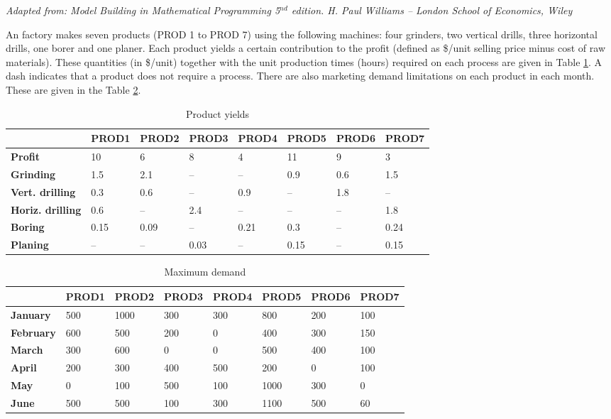 \textit{Adapted from: Model Building in Mathematical Programming 5$^{nd}$ edition.
	H. Paul Williams -- London School of Economics, Wiley}

An factory makes seven products (PROD 1 to PROD 7) using the
following machines: four grinders, two vertical drills, three horizontal drills, one
borer and one planer. Each product yields a certain contribution to the profit (defined
as \$/unit selling price minus cost of raw materials). These quantities (in \$/unit)
together with the unit production times (hours) required on each process are given
in Table \ref{table:prodyield}. A dash indicates that a product does not require a process. 
There are also marketing demand limitations on each product in each month. These are given in the Table \ref{table:mark}.

\begin{table}[h]
	\begin{tabular}{l|lllllll}
		& \textbf{PROD1} & \textbf{PROD2} & \textbf{PROD3} & \textbf{PROD4} & \textbf{PROD5} & \textbf{PROD6} & \textbf{PROD7} \\ \hline 
		\textbf{Profit} & 10    & 6     & 8     & 4     & 11    & 9     & 3     \\
		\textbf{Grinding}              & 1.5   & 2.1   & –     & –     & 0.9   & 0.6   & 1.5   \\
		\textbf{Vert. drilling}     & 0.3   & 0.6   & –     & 0.9   & –     & 1.8   & –     \\
		\textbf{Horiz. drilling}   & 0.6   & –     & 2.4   & –     & –     & –     & 1.8   \\
		\textbf{Boring}                & 0.15  & 0.09  & –     & 0.21  & 0.3   & –     & 0.24  \\
		\textbf{Planing}               & –     & –     & 0.03  & –     & 0.15  & –     & 0.15 \\ \hline
	\end{tabular}
	\caption{Product yields}
	\label{table:prodyield}
\end{table}

\begin{table}[H]
	\begin{tabular}{l|lllllll}
		& \textbf{PROD1} & \textbf{PROD2} & \textbf{PROD3} & \textbf{PROD4} & \textbf{PROD5} & \textbf{PROD6} & \textbf{PROD7} \\ \hline
		\textbf{January}   & 500   & 1000  & 300   & 300   & 800   & 200   & 100   \\
		\textbf{February}  & 600   & 500   & 200   & 0     & 400   & 300   & 150   \\
		\textbf{March}     & 300   & 600   & 0     & 0     & 500   & 400   & 100   \\
		\textbf{April}     & 200   & 300   & 400   & 500   & 200   & 0     & 100   \\
		\textbf{May}       & 0     & 100   & 500   & 100   & 1000  & 300   & 0     \\
		\textbf{June}      & 500   & 500   & 100   & 300   & 1100  & 500   & 60    \\ \hline
	\end{tabular}
	\caption{Maximum demand}
	\label{table:mark}
\end{table}

